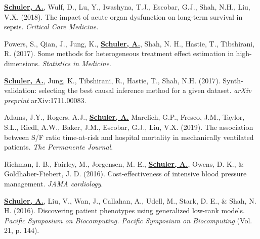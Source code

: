 \href{https://journals.lww.com/ccmjournal/Abstract/onlinefirst/The_Impact_of_Acute_Organ_Dysfunction_on_Long_Term.96340.aspx}{\textbf{Schuler, A.}}, Wulf, D., Lu, Y., Iwashyna, T.J., Escobar, G.J., Shah, N.H., Liu, V.X. 
(2018).
The impact of acute organ dysfunction on long-term survival in sepsis. 
\textsl{Critical Care Medicine.}

Powers, S., Qian, J., Jung, K., \href{https://arxiv.org/abs/1707.00102}{\textbf{Schuler, A.}}, Shah, N. H., Hastie, T., Tibshirani, R. 
(2017). 
Some methods for heterogeneous treatment effect estimation in high-dimensions. 
\textsl{Statistics in Medicine}.

\href{https://arxiv.org/abs/1711.00083}{\textbf{Schuler, A.}}, Jung, K., Tibshirani, R., Hastie, T., Shah, N.H. 
(2017). 
Synth-validation: selecting the best causal inference method for a given dataset. 
\textsl{arXiv preprint} arXiv:1711.00083.

Adams, J.Y., Rogers, A.J., \href{https://www-atsjournals-org.stanford.idm.oclc.org/doi/pdf/10.1164/ajrccm-conference.2017.195.1_MeetingAbstracts.A5029}{\textbf{Schuler, A.}} Marelich, G.P., Fresco, J.M., Taylor, S.L., Riedl, A.W., Baker, J.M., Escobar, G.J., Liu, V.X. 
(2019).
The association between S/F ratio time-at-risk and hospital mortality in mechanically ventilated patients. 
\textsl{The Permanente Journal}.

Richman, I. B., Fairley, M., Jorgensen, M. E., \href{https://jamanetwork.com/journals/jamacardiology/fullarticle/2551983}{\textbf{Schuler, A.}}, Owens, D. K., \& Goldhaber-Fiebert, J. D. 
(2016). 
Cost-effectiveness of intensive blood pressure management. 
\textsl{JAMA cardiology}.

\href{https://www.ncbi.nlm.nih.gov/pubmed/26776181}{\textbf{Schuler, A.}}, Liu, V., Wan, J., Callahan, A., Udell, M., Stark, D. E., \& Shah, N. H. 
(2016). 
Discovering patient phenotypes using generalized low-rank models. 
\textsl{Pacific Symposium on Biocomputing. Pacific Symposium on Biocomputing} (Vol. 21, p. 144).